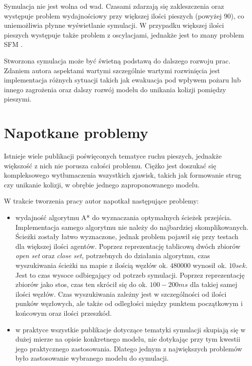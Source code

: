 Symulacja nie jest wolna od wad. Czasami zdarzają się zakleszczenia oraz występuje problem wydajnościowy przy większej ilości pieszych (powyżej 90), co uniemożliwia płynne wyświetlanie symulacji. W przypadku większej ilości pieszych występuje także problem z oscylacjami, jednakże jest to znany problem SFM \cite{oscillations}.

Stworzona symulacja może być świetną podstawą do dalszego rozwoju prac. Zdaniem autora aspektami wartymi szczególnie wartymi rozwinięcia jest implementacja różnych sytuacji takich jak ewakuacja pod wpływem pożaru lub innego zagrożenia oraz dalszy rozwój modelu do unikania kolizji pomiędzy pieszymi.

\section{Napotkane problemy}

Istnieje wiele publikacji poświęconych tematyce ruchu pieszych, jednakże większość z nich nie porusza całości problemu. Ciężko jest doszukać się kompleksowego wytłumaczenia wszystkich zjawisk, takich jak formowanie strug czy unikanie kolizji, w obrębie jednego zaproponowanego modelu.

W trakcie tworzenia pracy autor napotkał następujące problemy:

\begin{itemize}
\item wydajność algorytmu A* do wyznaczania optymalnych ścieżek przejścia. Implementacja samego algorytmu nie należy do najbardziej skomplikowanych. Ścieżki zostały łatwo wyznaczone, jednak problem pojawił się przy testach dla większej ilości agentów. Poprzez reprezentację tablicową dwóch zbiorów \textit{open set} oraz \textit{close set}, potrzebnych do działania algorytmu, czas wyszukiwania ścieżki na mapie z ilością węzłów ok. $480000$ wynosił ok. $10 sek$. Jest to czas wysoce odbiegający od potrzeb symulacji. Poprzez reprezentację zbiorów jako stos, czas ten skrócił się do ok. $100-200 ms$ dla takiej samej ilości węzłów. Czas wyszukiwania zależny jest w szczególności od ilości punków węzłowych, ale także od odległości między punktem początkowym i końcowym oraz ilości przeszkód.

\item w praktyce wszystkie publikacje dotyczące tematyki symulacji skupiają się w dużej mierze na opisie konkretnego modelu, nie dotykając przy tym kwestii jego praktycznego zastosowania. Dlatego jednym z największych problemów było zastosowanie wybranego modelu do symulacji.
\end{itemize}
